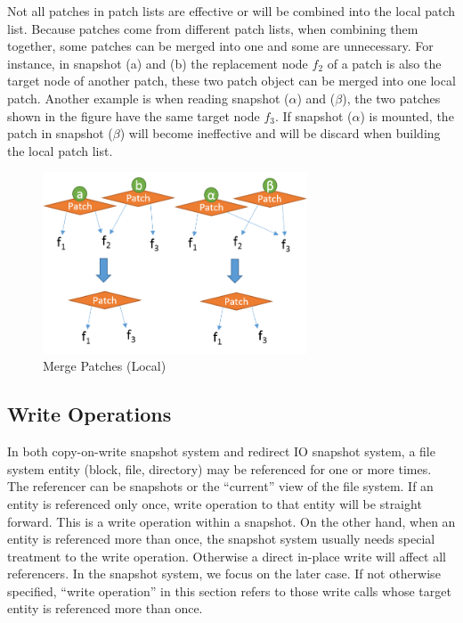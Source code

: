     Not all patches in patch lists are effective or will be combined into the local patch list. Because patches come from different patch lists, when combining them together, some patches can be merged into one and some are unnecessary. For instance, in  snapshot (a) and (b) the replacement node $f_2$ of a patch is also the target node of another patch, these two patch object can be merged into one local patch. Another example is when reading snapshot ($\alpha$) and ($\beta$), the two patches shown in the figure have the same target node $f_3$. If snapshot ($\alpha$) is mounted, the patch in snapshot ($\beta$) will become ineffective and will be discard when building the local patch list.

\begin{figure}[t]
\centering
\includegraphics[width=0.7\textwidth]{Chapter-4/figs/fig19.png}
\caption{Merge Patches (Local)}
\label{fig:merge}
\end{figure}

\subsection{Write Operations}

    In both copy-on-write snapshot system and redirect IO snapshot system, a file system entity (block, file, directory) may be referenced for one or more times. The referencer can be snapshots or the ``current'' view of the file system. If an entity is referenced only once, write operation to that entity will be straight forward. This is a write operation within a snapshot. On the other hand, when an entity is referenced more than once, the snapshot system usually needs special treatment to the write operation. Otherwise a direct in-place write will affect all referencers. In the snapshot system, we focus on the later case. If not otherwise specified, ``write operation'' in this section refers to those write calls whose target entity is referenced more than once.

